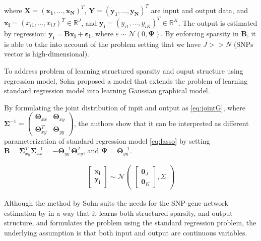 \documentclass{article}
\begin{document}
where $\mathbf{X}=(\mathbf{x_1}, ... ,\mathbf{x_N})^T$, $\mathbf{Y}=(\mathbf{y_1}, ... ,\mathbf{y_N})^T$ are input and output data, and $\mathbf{x_i}=(x_{i1}, ... ,x_{iJ})^T \in \mathbb{R}^J$, and $\mathbf{y_i}=(y_{i1}, ... ,y_{iK})^T \in \mathbb{R}^K$.
The output is estimated by regression: $\mathbf{y_i}=\mathbf{Bx_i}+\mathbf{\varepsilon_i}$, where $\varepsilon  \sim \mathcal{N}(0, \mathbf{\Psi})$.
By enforcing sparsity in \textbf{B}, it is able to take into account of the problem setting that we have $J >> N$ (SNPs vector is high-dimensional).

To address problem of learning structured sparsity and ouput structure using regression model, Sohn \cite{sohn2012joint} proposed a model that extends the problem of learning standard regression model into learning Gaussian graphical model.

By formulating the joint distribution of inpit and output as \ref{eq:jointG}, where $ \mathbf{\Sigma}^{-1}= \begin{pmatrix}
    \mathbf{\Theta}_{xx} & \mathbf{\Theta}_{xy}\\
   \mathbf{\Theta}_{xy}^T &  \mathbf{\Theta}_{yy}  
\end{pmatrix}$,
the authors show that it can be interpreted as different parameterization of standard regression model \ref{eq:lasso} by setting $\mathbf{B}=\mathbf{\Sigma}_{xy}^T \mathbf{\Sigma}_{xx}^{-1}=-\mathbf{\Theta}_{yy}^{-1}\mathbf{\Theta}_{xy}^T$, and $\mathbf{\Psi}= \mathbf{\Theta}_{yy}^{-1}$.



\begin{align}\label{eq:jointG}
\begin{bmatrix}
    \mathbf{x_i}\\
    \mathbf{y_i}
\end{bmatrix}
 \sim \mathcal{N}
 \begin{pmatrix}
\begin{bmatrix}
    \mathbf{0}_J  \\
   \mathbf{0}_K
\end{bmatrix}
,
    \Sigma
\end{pmatrix}
\end{align}

Although the method by Sohn suits the needs for the SNP-gene network estimation by in a way that it learns both structured sparsity, and output structure, and formulates the problem using the standard regression problem, the underlying assumption is that both input and output are continuous variables. 
\end{document}
